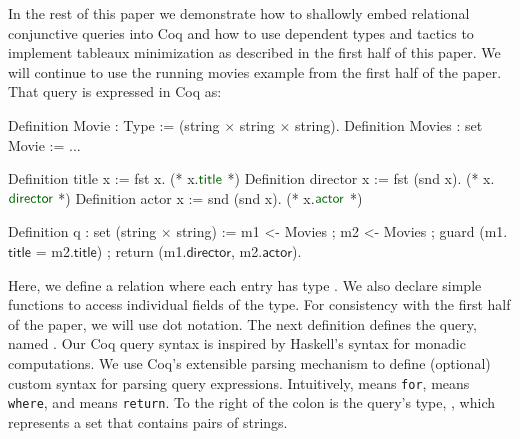 \documentclass[preprint]{sigplanconf}
\begin{document}
In the rest of this paper we demonstrate how to shallowly embed relational conjunctive queries into Coq and how to use dependent types and tactics to implement tableaux minimization as described in the first half of this paper.  We will continue to use the running movies example from the first half of the paper.  That query is expressed in Coq as:
\begin{coq}
Definition Movie : Type := (string $\times$ string $\times$ string).
Definition Movies : set Movie := ...

Definition title x := fst x. (* x.$\textcolor{dkgreen}{\textsf{title}}$ *)
Definition director x := fst (snd x). (* x.$\textcolor{dkgreen}{\textsf{director}}$ *)
Definition actor x := snd (snd x). (* x.$\textcolor{dkgreen}{\textsf{actor}}$ *)

Definition q : set (string $\times$ string) :=
  m1 <- Movies ; m2 <- Movies ;
  guard (m1.$\textsf{title}$ = m2.$\textsf{title}$) ;
  return (m1.$\textsf{director}$, m2.$\textsf{actor}$).
\end{coq}
Here, we define a relation  where each entry has type .
We also declare simple functions to access individual fields of the  type. For consistency with the first half of the paper, we will use dot notation.
The next definition defines the query, named .  Our Coq query syntax is inspired by Haskell's syntax for monadic computations.
We use Coq's extensible parsing mechanism to define (optional) custom syntax for parsing query expressions. Intuitively, \coqe{<-} means {\tt for},  means {\tt where}, and  means {\tt return}.  To the right of the colon is the query's type, , which represents a set that contains pairs of strings.
\end{document}
